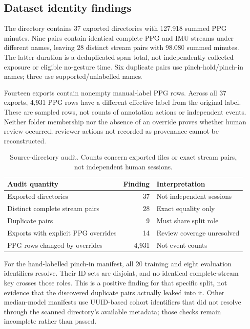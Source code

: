 \subsection{Dataset identity findings}\label{dataset-identity-findings}

The directory contains 37 exported directories with 127.918 summed PPG minutes. Nine pairs contain identical complete PPG and IMU streams under different names, leaving 28 distinct stream pairs with 98.080 summed minutes. The latter duration is a deduplicated span total, not independently collected exposure or eligible no-gesture time. Six duplicate pairs use pinch-hold/pinch-in names; three use supported/unlabelled names.

Fourteen exports contain nonempty manual-label PPG rows. Across all 37 exports, 4,931 PPG rows have a different effective label from the original label. These are sampled rows, not counts of annotation actions or independent events. Neither folder membership nor the absence of an override proves whether human review occurred; reviewer actions not recorded as provenance cannot be reconstructed.

\begin{table}[t]
\centering\small
\caption{Source-directory audit. Counts concern exported files or exact stream pairs, not independent human sessions.}
\begin{tabularx}{\linewidth}{@{}>{\raggedright\arraybackslash}Xr>{\raggedright\arraybackslash}X@{}}
\toprule
\textbf{Audit quantity} & \textbf{Finding} & \textbf{Interpretation} \\
\midrule
Exported directories & 37 & Not independent sessions \\
Distinct complete stream pairs & 28 & Exact equality only \\
Duplicate pairs & 9 & Must share split role \\
Exports with explicit PPG overrides & 14 & Review coverage unresolved \\
PPG rows changed by overrides & 4,931 & Not event counts \\
\bottomrule
\end{tabularx}
\end{table}

For the hand-labelled pinch-in manifest, all 20 training and eight evaluation identifiers resolve. Their ID sets are disjoint, and no identical complete-stream key crosses those roles. This is a positive finding for that specific split, not evidence that the discovered duplicate pairs actually leaked into it. Other median-model manifests use UUID-based cohort identifiers that did not resolve through the scanned directory's available metadata; those checks remain incomplete rather than passed.


